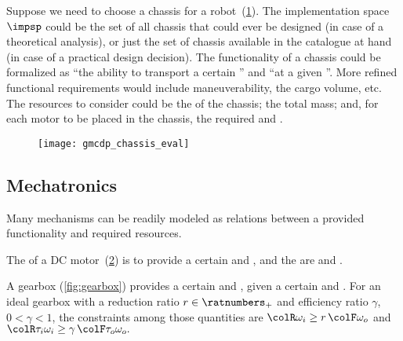 \begin{example}
    \label{exa:chassis}Suppose we need to choose a chassis for a robot~(\cref{fig:gmcdp_chassis_eval}).
    The implementation space~$\impsp$ could be the set of all chassis
    that could ever be designed (in case of a theoretical analysis), or
    just the set of chassis available in the catalogue at hand (in case
    of a practical design decision). The functionality of a chassis could
    be formalized as ``the ability to transport a certain '' and ``at a given ''. More refined
    functional requirements would include maneuverability, the cargo volume,
    etc. The resources to consider could be the  of
    the chassis; the total mass; and, for each motor to be placed in the
    chassis, the required  and .
\end{example}
\begin{figure}[h]
    \centering
    \texttt{[image: gmcdp\_chassis\_eval]}
    \caption{}
    \label{fig:gmcdp_chassis_eval}
\end{figure}

\subsection{Mechatronics}


Many mechanisms can be readily modeled as relations between a provided
functionality and required resources.


\begin{example}
    The  of a DC motor~(\cref{fig:dc_motor})
    is to provide a certain  and , and the 
    are  and .
\end{example}

\begin{figure}[h]
    \begin{center}
    \end{center}
    \caption{}
    \label{fig:dc_motor}
\end{figure}


\begin{example}
    A gearbox (\cref{fig:gearbox}) provides a certain  and , given a certain
     and . For
    an ideal gearbox with a reduction ratio $r \in \ratnumbers_+$ and
    efficiency ratio $\gamma$, $0<\gamma<1$, the constraints among
    those quantities are ${\colR \omega_i}\geq r\,{\colF \omega_o}$
    and ${\colR \tau_i\omega_i}\geq\gamma\,{\colF \tau_o\omega_o}.$
\end{example}

